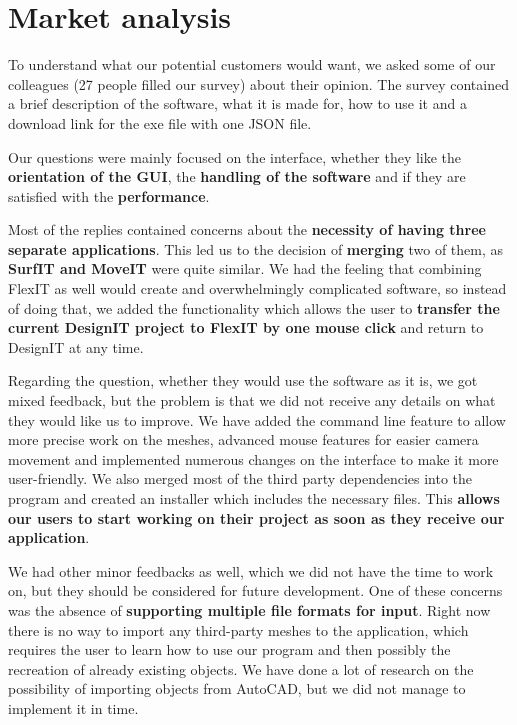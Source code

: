 \documentclass[a4paper, 11pt, article]{report}
\begin{document}
\section{Market analysis}

To understand what our potential customers would want, we asked some of our colleagues (27 people filled our survey) about their opinion. The survey contained a brief description of the software, what it is made for, how to use it and a download link for the exe file with one JSON file.

Our questions were mainly focused on the interface, whether they like the \textbf{orientation of the GUI}, the \textbf{handling of the software} and if they are satisfied with the \textbf{performance}.

Most of the replies contained concerns about the \textbf{necessity of having three separate applications}. This led us to the decision of \textbf{merging} two of them, as \textbf{SurfIT and MoveIT} were quite similar. We had the feeling that combining FlexIT as well would create and overwhelmingly complicated software, so instead of doing that, we added the functionality which allows the user to \textbf{transfer the current DesignIT project to FlexIT by one mouse click} and return to DesignIT at any time.

Regarding the question, whether they would use the software as it is, we got mixed feedback, but the problem is that we did not receive any details on what they would like us to improve. We have added the command line feature to allow more precise work on the meshes, advanced mouse features for easier camera movement and implemented numerous changes on the interface to make it more user-friendly. We also merged most of the third party dependencies into the program and created an installer which includes the necessary files. This \textbf{allows our users to start working on their project as soon as they receive our application}.

We had other minor feedbacks as well, which we did not have the time to work on, but they should be considered for future development. One of these concerns was the absence of \textbf{supporting multiple file formats for input}. Right now there is no way to import any third-party meshes to the application, which requires the user to learn how to use our program and then possibly the recreation of already existing objects. We have done a lot of research on the possibility of importing objects from AutoCAD, but we did not manage to implement it in time.
\end{document}
